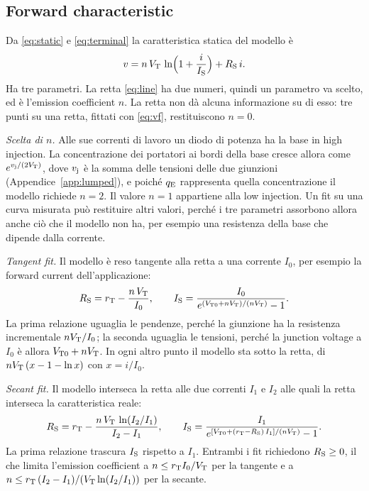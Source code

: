 \documentclass[10pt,a4paper]{scrartcl}
\let\newcommand\lmitdefine
\newcommand{\qE}{q_\mathrm{E}}
\newcommand{\vj}{v_\mathrm{j}}
\newcommand{\IS}{I_\mathrm{S}}
\newcommand{\RS}{R_\mathrm{S}}
\newcommand{\VT}{V_\mathrm{T}}
\newcommand{\VTo}{V_\mathrm{T0}}
\newcommand{\rT}{r_\mathrm{T}}
\begin{document}
\subsection{Forward characteristic}
\label{sec:forward}
Da \eqref{eq:static} e \eqref{eq:terminal} la caratteristica statica del modello è
\begin{equation}
v = n\,\VT\,\ln\Bigl(1 + \frac{i}{\IS}\Bigr) + \RS\, i .
\label{eq:vf}
\end{equation}
Ha tre parametri. La retta \eqref{eq:line} ha due numeri, quindi un parametro va scelto, ed è l'emission coefficient $n$. La retta non dà alcuna informazione su di esso: tre punti su una retta, fittati con \eqref{eq:vf}, restituiscono $n = 0$.

\emph{Scelta di $n$.} Alle sue correnti di lavoro un diodo di potenza ha la base in high injection. La concentrazione dei portatori ai bordi della base cresce allora come $e^{\vj/(2\VT)}$, dove $\vj$ è la somma delle tensioni delle due giunzioni (Appendice~\ref{app:lumped}), e poiché $\qE$ rappresenta quella concentrazione il modello richiede $n = 2$. Il valore $n = 1$ appartiene alla low injection. Un fit su una curva misurata può restituire altri valori, perché i tre parametri assorbono allora anche ciò che il modello non ha, per esempio una resistenza della base che dipende dalla corrente.

\emph{Tangent fit.} Il modello è reso tangente alla retta a una corrente $I_0$, per esempio la forward current dell'applicazione:
\begin{equation}
\RS = \rT - \frac{n\,\VT}{I_0} , \qquad \IS = \frac{I_0}{e^{(\VTo + n\VT)/(n\VT)} - 1} .
\label{eq:tangent}
\end{equation}
La prima relazione uguaglia le pendenze, perché la giunzione ha la resistenza incrementale $n\VT/I_0$; la seconda uguaglia le tensioni, perché la junction voltage a $I_0$ è allora $\VTo + n\VT$. In ogni altro punto il modello sta sotto la retta, di $n\VT\,(x - 1 - \ln x)$ con $x = i/I_0$.

\emph{Secant fit.} Il modello interseca la retta alle due correnti $I_1$ e $I_2$ alle quali la retta interseca la caratteristica reale:
\begin{equation}
\RS = \rT - \frac{n\,\VT\,\ln(I_2/I_1)}{I_2 - I_1} , \qquad \IS = \frac{I_1}{e^{[\VTo + (\rT-\RS)\,I_1]/(n\VT)} - 1} .
\label{eq:secant}
\end{equation}
La prima relazione trascura $\IS$ rispetto a $I_1$. Entrambi i fit richiedono $\RS \geq 0$, il che limita l'emission coefficient a $n \leq \rT I_0/\VT$ per la tangente e a $n \leq \rT\,(I_2-I_1)/(\VT\ln(I_2/I_1))$ per la secante.
\end{document}
